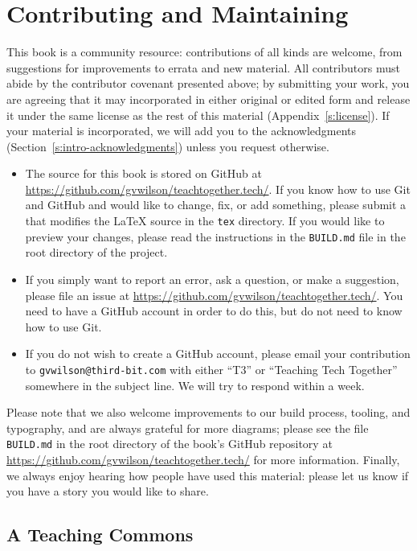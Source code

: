 \section{Contributing and Maintaining}\label{s:joining-contributing}

This book is a community resource: contributions of all kinds are
welcome, from suggestions for improvements to errata and new material.
All contributors must abide by the contributor covenant presented above;
by submitting your work, you are agreeing that it may incorporated in
either original or edited form and release it under the same license as
the rest of this material (Appendix~\ref{s:license}). If your material is
incorporated, we will add you to the acknowledgments
(Section~\ref{s:intro-acknowledgments}) unless you request otherwise.

\begin{itemize}
\item
  The source for this book is stored on GitHub at
  \url{https://github.com/gvwilson/teachtogether.tech/}. If you know how to use Git and
  GitHub and would like to change, fix, or add something, please
  submit a  that modifies the LaTeX
  source in the \texttt{tex} directory. If you would like to preview your
  changes, please read the instructions in the \texttt{BUILD.md} file in the
  root directory of the project.
\item
  If you simply want to report an error, ask a question, or make a
  suggestion, please file an issue at
  \url{https://github.com/gvwilson/teachtogether.tech/}. You need to have a GitHub account in
  order to do this, but do not need to know how to use Git.
\item
  If you do not wish to create a GitHub account, please email your
  contribution to \texttt{gvwilson@third-bit.com} with either
  ``T3'' or ``Teaching Tech Together'' somewhere in the subject line. We
  will try to respond within a week.
\end{itemize}

Please note that we also welcome improvements to our build process,
tooling, and typography, and are always grateful for more diagrams;
please see the file \texttt{BUILD.md} in the root directory of the book's
GitHub repository at \url{https://github.com/gvwilson/teachtogether.tech/} for more
information. Finally, we always enjoy hearing how people have used
this material: please let us know if you have a story you would like
to share.

\subsection*{A Teaching Commons}

